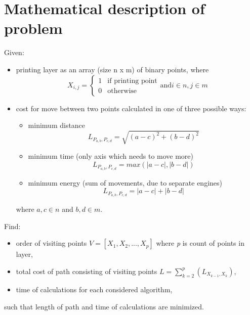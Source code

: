 \documentclass[titlepage]{article}
\begin{document}
\section{Mathematical description of problem}
Given:
\begin{itemize}
\item printing layer as an array (size n x m) of binary points, where
\begin{equation}
\label{layer}
X_{i,j}=\left\{ \begin{array}{rl}
 1 &\mbox{if printing point} \\
 0 &\mbox{otherwise}
       \end{array} \right. \mbox{and} i \in n, j \in m
\end{equation}
\item cost for move between two points calculated in one of three possible ways:
\begin{itemize}
\item minimum distance
\begin{equation}
\label{distance_cost}
L_{P_{a,b}, P_{c,d}} = \sqrt{(a-c)^2+(b-d)^2}
\end{equation}
\item minimum time (only axis which needs to move more)
\begin{equation}
\label{time_cost}
L_{P_{a,b}, P_{c,d}} = max(|a-c|, |b-d|)
\end{equation}
\item minimum energy (sum of movements, due to separate engines)
\begin{equation}
\label{energy_cost}
L_{P_{a,b}, P_{c,d}} = |a-c|+|b-d|
\end{equation}
\end{itemize}
where $a, c \in n$ and $b, d \in m$.
\end{itemize}

Find:
\begin{itemize}
\item order of visiting points $V=[X_1, X_2, ..., X_p]$ where \textit{p} is count of points in layer,
\item total cost of path consisting of visiting points $L=\sum\limits_{k=2}^p (L_{X_{k-1}, X_k})$,
\item time of calculations for each considered algorithm,
\end{itemize}
such that length of path and time of calculations are minimized.

\pagebreak
\end{document}
